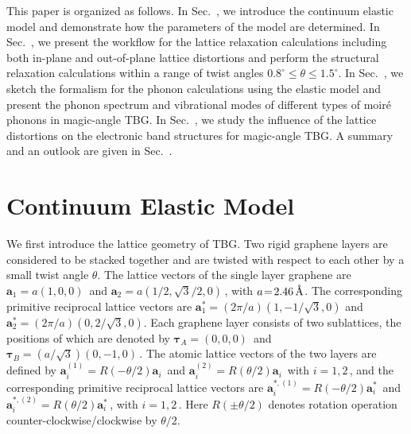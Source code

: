 \documentclass[aps,prx,10pt,twocolumn,superscriptaddress]{revtex4}
\def\II{\uppercase\expandafter{\romannumeral 2}}
\def\III{{\uppercase\expandafter{\romannumeral 3}}}
\def\IV{{\uppercase\expandafter{\romannumeral 4}}}
\def\V{{\uppercase\expandafter{\romannumeral 5}}}
\def\VI{{\uppercase\expandafter{\romannumeral 6}}}
\def\angstrom{\mbox{\normalfont\AA}}
\def\angstrom{\mbox{\normalfont\AA}}
\begin{document}
This paper is organized as follows. In Sec.~\II, we introduce the continuum elastic model and demonstrate how the parameters of the model are determined. In Sec.~\III, we present the workflow for the lattice relaxation calculations including both in-plane and out-of-plane lattice distortions and perform the structural relaxation calculations within a range of twist angles $0.8^{\circ}\leq\theta\leq 1.5^{\circ}$. In Sec.~\IV, we sketch the formalism for the phonon calculations using the elastic model and present the phonon spectrum and vibrational modes of different types of moir\'e phonons in magic-angle TBG. In Sec.~\V, we study the influence of the lattice distortions on the electronic band structures for magic-angle TBG. A summary and an outlook are given in Sec.~\VI.

\section{Continuum Elastic Model}
\label{sec:continu_elas_model}

We first introduce the lattice geometry of TBG. 
Two rigid graphene layers are considered to be stacked together and are twisted with respect to each other by a small twist angle $\theta$. The lattice vectors of the single layer graphene are $\textbf{a}_{1}\!=\!a(1,0,0)\,$ and $\textbf{a}_{2}\!=\!a(1/2,\sqrt{3}/2,0)\,$, with $a\!=\!2.46\,\angstrom$. The corresponding primitive reciprocal lattice vectors are $\textbf{a}^{*}_{1}=(2\pi/a)(1,-1/\sqrt{3},0)$ and $\textbf{a}^{*}_{2}=(2\pi/a)(0,2/\sqrt{3},0)$. Each graphene layer consists of two sublattices, the positions of which are denoted by $\bm{\tau}_{A}\!=\!(0,0,0)\,$ and $\bm{\tau}_{B}\!=\!(a/\sqrt{3})(0,-1,0)\,$. The atomic lattice vectors of the two layers are defined by $\textbf{a}^{(1)}_{i}=R(-\theta/2)\textbf{a}_{i}\,$ and $\textbf{a}^{(2)}_{i}\!=\!R(\theta/2)\textbf{a}_{i}\,$ with $i\!=\!1,2\,$, and the corresponding primitive reciprocal lattice vectors are $\textbf{a}^{*,(1)}_{i}\!=\!R(-\theta/2)\textbf{a}^{*}_{i}\,$ and $\textbf{a}^{*,(2)}_{i}\!=\!R(\theta/2)\textbf{a}^{*}_{i}\,$, with $i\!=\!1,2\,$. Here $R(\pm\theta/2)$ denotes rotation operation counter-clockwise/clockwise by $\theta/2$.
\end{document}
